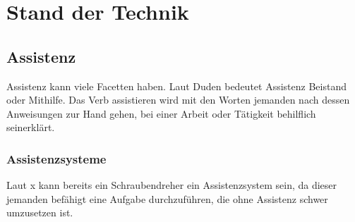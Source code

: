 
\chapter{Stand der Technik}
\label{sec:StandDerTechnik}


\section{Assistenz}
Assistenz kann viele Facetten haben. Laut Duden bedeutet Assistenz Beistand oder Mithilfe. Das Verb assistieren wird mit den Worten \glqq jemanden nach dessen Anweisungen zur Hand gehen, bei einer Arbeit oder Tätigkeit behilflich sein\grqq erklärt.


\subsection{Assistenzsysteme}
Laut x kann bereits ein Schraubendreher ein Assistenzsystem sein, da dieser jemanden befähigt eine Aufgabe durchzuführen, die ohne Assistenz schwer umzusetzen ist.